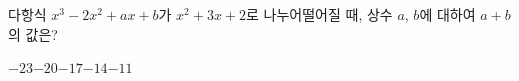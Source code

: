 다항식 $x^3-2x^2+ax+b$가 $x^2+3x+2$로 나누어떨어질 때, 상수 $a$, $b$에 대하여 $a+b$의 값은?
\begin{choices32}{$-23$}{$-20$}{$-17$}{$-14$}{$-11$}\end{choices32}
